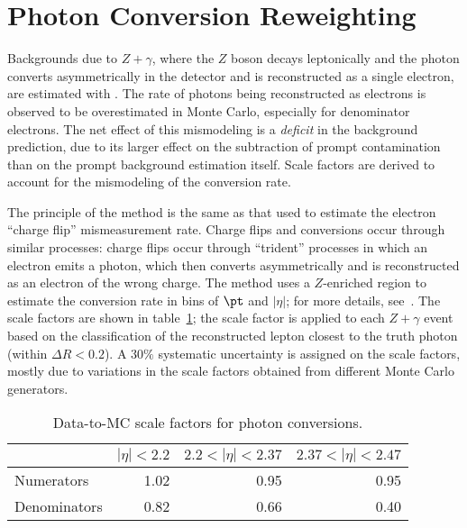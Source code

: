 \appendix

\section{Photon Conversion Reweighting}\label{sec:conversion-reweighting}
Backgrounds due to $Z+\gamma$, where the $Z$ boson decays leptonically and the photon converts asymmetrically in the detector and is reconstructed as a single electron, are estimated with \sherpa. The rate of photons being reconstructed as electrons is observed to be overestimated in Monte Carlo, especially for denominator electrons. The net effect of this mismodeling is a \emph{deficit} in the background prediction, due to its larger effect on the subtraction of prompt contamination than on the prompt background estimation itself. Scale factors are derived to account for the mismodeling of the conversion rate. 

The principle of the method is the same as that used to estimate the electron ``charge flip'' mismeasurement rate. Charge flips and conversions occur through similar processes: charge flips occur through ``trident'' processes in which an electron emits a photon, which then converts asymmetrically and is reconstructed as an electron of the wrong charge. The method uses a $Z$-enriched region to estimate the conversion rate in bins of $\pt$ and $|\eta|$; for more details, see~\cite{DeViveiros:1670929}. The scale factors are shown in table~\ref{table:conversion-sfs}; the scale factor is applied to each $Z+\gamma$ event based on the classification of the reconstructed lepton closest to the truth photon (within $\Delta R<0.2$). A $30\%$ systematic uncertainty is assigned on the scale factors, mostly due to variations in the scale factors obtained from different Monte Carlo generators. 

\begin{table}[tbp]
  \centering
  \begin{tabular}{l r r r}
					 &$|\eta|<2.2$     &$2.2<|\eta|<2.37$     &$2.37<|\eta|<2.47$\\
	\hline
	Numerators       &1.02             &0.95                  &0.95\\
	Denominators     &0.82             &0.66                  &0.40\\
  \end{tabular}
  \caption{Data-to-MC scale factors for photon conversions.}
  \label{table:conversion-sfs}
\end{table}

